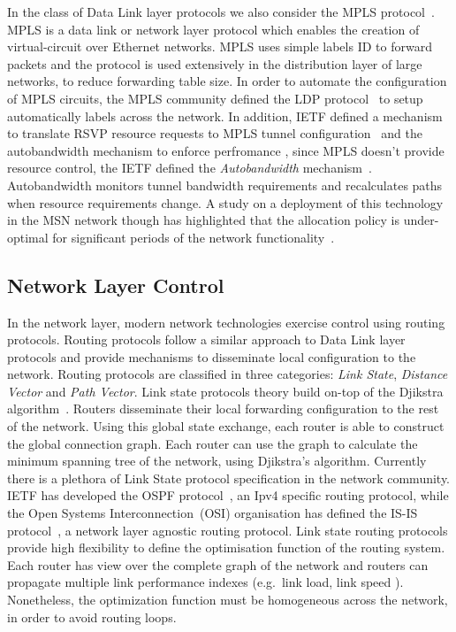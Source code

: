 In the class of Data Link layer protocols we also consider the MPLS
protocol~\cite{RFC3031}. MPLS is a data link or network layer protocol which
enables the creation of virtual-circuit over Ethernet networks.  MPLS uses
simple labels ID to forward packets and the protocol is used extensively in the
distribution layer of large networks, to reduce forwarding table size. In order
to automate the configuration of MPLS circuits, the MPLS community defined the
LDP protocol~\cite{RFC5036} to setup automatically labels across the network. In
addition, IETF defined a mechanism to translate RSVP resource requests to MPLS
tunnel configuration~\cite{RFC3209} and the autobandwidth mechanism to enforce
perfromance , since MPLS doesn't provide resource control, the IETF defined the
{\it Autobandwidth} mechanism~\cite{osborne02}.  Autobandwidth monitors tunnel
bandwidth requirements and recalculates paths when resource requirements change.
A study on a deployment of this technology in the MSN network though has
highlighted that the allocation policy is under-optimal for significant periods
of the network functionality~\cite{Pathak2011}.


\subsection{Network Layer Control}

In the network layer, modern network technologies exercise control using routing
protocols. Routing protocols follow a similar approach to Data Link layer
protocols and provide mechanisms to disseminate local configuration to the
network. Routing protocols are classified in three categories: \emph{Link
  State}, \emph{Distance Vector} and \emph{Path Vector}. Link state protocols
theory build on-top of the Djikstra algorithm~\cite{Djikstra1959}. Routers
disseminate their local forwarding configuration to the rest of the network.
Using this global state exchange, each router is able to construct the global
connection graph. Each router can use the graph to calculate the minimum
spanning tree of the network, using Djikstra's algorithm.  Currently there is a
plethora of Link State protocol specification in the network community.  IETF
has developed the OSPF protocol~\cite{RFC2328}, an Ipv4 specific routing
protocol, while the Open Systems Interconnection~(OSI) organisation has defined
the IS-IS protocol~\cite{RFC1142}, a network layer agnostic routing protocol.
Link state routing protocols provide high flexibility to define the optimisation
function of the routing system.  Each router has view over the complete graph of
the network and routers can propagate multiple link performance indexes
(e.g.~link load, link speed ).  Nonetheless, the optimization function must be
homogeneous across the network, in order to avoid routing loops.

